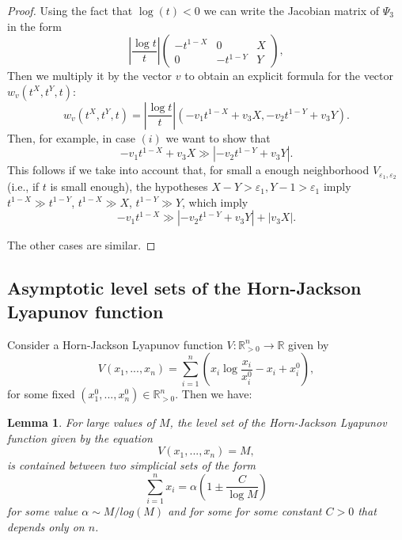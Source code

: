 \documentclass[12pt,letterpaper]{article}
\newtheorem{lem}[thm]{Lemma}
\newcommand{\RR}{\mathbb{R}}
\newcommand{\RRp}{\mathbb{R}_{>0}}
\newcommand{\eps}{\varepsilon}
\begin{document}
\begin{proof}
Using the fact that $\log(t)<0$ we can write the Jacobian matrix of $\Psi_3$ in the form
%
\begin{equation} \label{JacPsi}
\left|
\frac{\log t}{t}
\right|
\left(
\begin{array}{ccc}
-t^{1-X} &    0     &  X \\
   0    & -t^{1-Y}  &  Y 
\end{array}
\right),
\end{equation}
Then we multiply it by the vector $v$ to obtain an explicit formula for the vector $w_v(t^X, t^Y, t)$:
$$
w_v(t^X, t^Y, t) = \left| \frac{\log t}{t} \right|  \left(  - v_1t^{1-X} + v_3 X ,  -v_2t^{1-Y} + v_3 Y \right).
$$
Then, for example, in case $(i)$ we want to show that 
$$ 
- v_1t^{1-X} + v_3 X  \gg   |-v_2t^{1-Y} + v_3 Y|.
$$ 
This follows if we take into account that, for small a enough neighborhood $V_{\eps_1, \eps_2}$ (i.e., if $t$ is small enough), the hypotheses $X-Y>\eps_1, Y-1>\eps_1$ imply   $t^{1-X}  \gg  t^{1-Y}$, $t^{1-X}  \gg  X$, $t^{1-Y}  \gg  Y$, which imply 
$$
- v_1t^{1-X}   \gg   |-v_2t^{1-Y} + v_3 Y| + |v_3 X|.
$$ 

\noindent
The other cases are similar.
%
\end{proof}










\bigskip

\subsection{Asymptotic level sets of the Horn-Jackson Lyapunov function}

Consider a Horn-Jackson Lyapunov function $V : \RRp^n \to \RR$ given by 
$$
V(x_1, ..., x_n) = \sum_{i=1}^n (x_i \log \frac{x_i}{x_i^0} -x_i + x_i^0),
$$
for some fixed $(x_1^0, ..., x_n^0) \in \RRp^n$. Then we have:

\begin{lem}
\label{lemma_asymptotics_of_Horn-Jackson_Lyapunov_function}
For large values of $M$, the level set of the Horn-Jackson Lyapunov function given by the equation
$$
V(x_1, ..., x_n) = M,
$$
is contained between two simplicial sets of the form 
$$
\sum_{i=1}^n x_i = \alpha \left( 1 \pm \frac{C}{\log M} \right)
$$
for some value $\alpha \sim M/log(M)$ and for some for some constant $C>0$ that depends only on $n$.
\end{lem}
\end{document}
